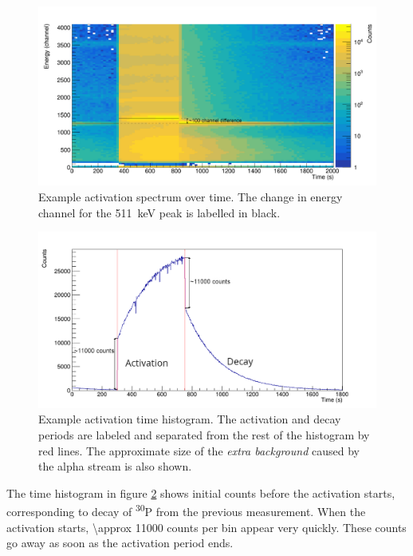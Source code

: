 \documentclass[a4paper,12pt]{report}
\newcommand{\Piso}{\textsuperscript{30}P }
\begin{document}
\begin{figure}[H]
	\centering
	\includegraphics[width=\textwidth]{example_activation_energytime.png}
	\caption{Example activation spectrum over time.
	The change in energy channel for the \qty{511}{\keV} peak is labelled in black.}
	\label{example_activation_energytime}
\end{figure}

\begin{figure}[H]
	\centering
	\includegraphics[width=\textwidth]{example_activation_time_histogram.png}
	\caption{Example activation time histogram.
	The activation and decay periods are labeled and separated from the rest of the histogram by red lines.
	The approximate size of the \textit{extra background} caused by the alpha stream is also shown.}
	\label{example_activation_time_histogram}
\end{figure}

The time histogram in figure \ref{example_activation_time_histogram} shows initial counts before the activation starts, corresponding to decay of \Piso from the previous measurement.
When the activation starts, \num{\approx 11000} counts per bin appear very quickly.
These counts go away as soon as the activation period ends.
\end{document}
